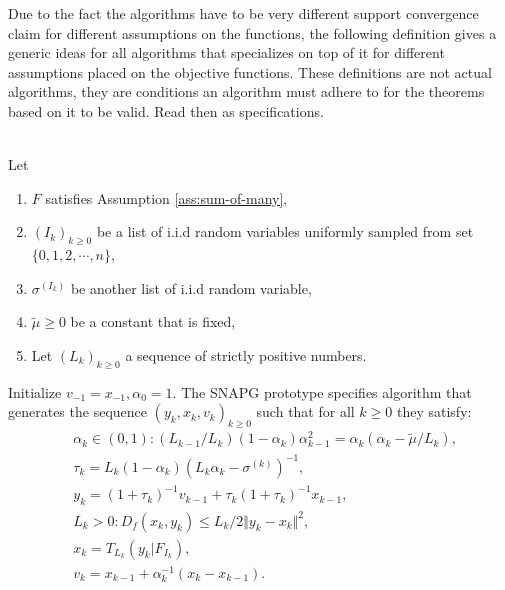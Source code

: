 \documentclass[12pt]{article}
\begin{document}
    Due to the fact the algorithms have to be very different support convergence claim for different assumptions on the functions, the following definition gives a generic ideas for all algorithms that specializes on top of it for different assumptions placed on the objective functions. 
    These definitions are not actual algorithms, they are conditions an algorithm must adhere to for the theorems based on it to be valid. 
    Read then as specifications. 
    \begin{definition}\;\label{def:snapg-v2-proto}\\
        Let 
        \begin{enumerate}[nosep]
            \item $F$ satisfies Assumption \ref{ass:sum-of-many}, 
            \item $(I_k)_{k \ge 0}$ be a list of i.i.d random variables uniformly sampled from set $\{0, 1, 2, \cdots, n\}$, 
            \item $\sigma^{(I_k)}$ be another list of i.i.d random variable, 
            \item $\tilde \mu \ge 0$ be a constant that is fixed, 
            \item Let $(L_k)_{k \ge 0}$ a sequence of strictly positive numbers. 
        \end{enumerate}
        Initialize $v_{-1} = x_{-1}, \alpha_0 = 1$. 
        The SNAPG prototype specifies algorithm that generates the sequence $(y_k, x_k, v_k)_{k \ge 0}$ such that for all $k \ge 0$ they satisfy: 
        \begin{align*}
            & \alpha_k \in (0, 1): (L_{k - 1}/L_k)(1 - \alpha_{k})\alpha_{k - 1}^2 = \alpha_{k}\left(\alpha_{k} - \tilde \mu/L_k\right), \\
            & \tau_k = L_k(1 - \alpha_k)\left(L_k \alpha_k - \sigma^{(k)}\right)^{-1}, \\
            & y_k = (1 + \tau_k)^{-1}v_{k - 1} + \tau_k(1 + \tau_k)^{-1}x_{k - 1}, \\
            & L_k > 0: D_f(x_k, y_k) \le L_k/2\Vert y_k - x_k\Vert^2, \\
            & x_k =  T_{L_k}(y_k | F_{I_k}), \\
            & v_k = x_{k - 1} + \alpha_k^{-1}(x_k - x_{k - 1}). 
        \end{align*}
    \end{definition}
\end{document}
